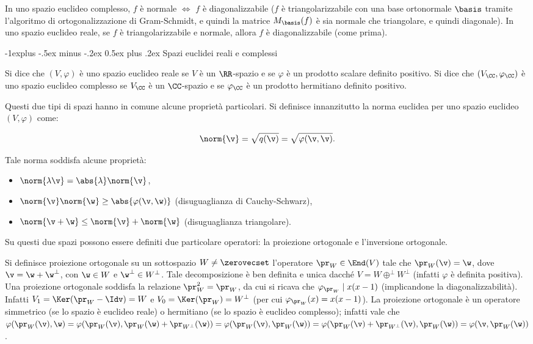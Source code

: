 \documentclass[10pt,landscape]{article}
\makeatletter
\renewcommand{\subsection}{\@startsection{subsection}{2}{0mm}%
	{-1explus -.5ex minus -.2ex}%
	{0.5ex plus .2ex}%
	{\normalfont\normalsize\bfseries}}
\makeatother
\begin{document}
\begin{multicols}{3}
		In uno spazio euclideo complesso, $f$ è normale $\iff$ $f$ è diagonalizzabile ($f$ è triangolarizzabile con una base ortonormale $\basis$ tramite
		l'algoritmo di ortogonalizzazione di Gram-Schmidt, e quindi la matrice $M_\basis(f)$ è sia normale che
		triangolare, e quindi diagonale). In uno spazio
		euclideo reale, se $f$ è triangolarizzabile e
		normale, allora $f$ è diagonalizzabile (come prima).
		
		\subsection{Spazi euclidei reali e complessi}
		
		Si dice che $(V, \varphi)$ è uno spazio euclideo reale se $V$ è un $\RR$-spazio e se
		$\varphi$ è un prodotto scalare definito positivo. Si dice che $(V_\CC, \varphi_\CC)$ è uno spazio euclideo complesso se $V_\CC$ è un $\CC$-spazio e se $\varphi_\CC$ è un
		prodotto hermitiano definito positivo.
		
		Questi due tipi di spazi hanno in comune alcune proprietà particolari. Si definisce
		innanzitutto la norma euclidea per uno spazio euclideo $(V, \varphi)$ come:
		
		\[ \norm{\v} = \sqrt{q(\v)} = \sqrt{\varphi(\v, \v)}. \]
		
		Tale norma soddisfa alcune proprietà:
		
		\begin{itemize}
			\item $\norm{\lambda \v} = \abs{\lambda} \norm{\v}$,
			\item $\norm{\v} \norm{\w} \geq \abs{\varphi(\v, \w)}$ (disuguaglianza di Cauchy-Schwarz),
			\item $\norm{\v + \w} \leq \norm{\v} + \norm{\w}$ (disuguaglianza triangolare).
		\end{itemize}
		
		Su questi due spazi possono essere definiti due particolare operatori: la
		proiezione ortogonale e l'inversione ortogonale.
		
		Si definisce proiezione ortogonale su un sottospazio $W \neq \zerovecset$ l'operatore $\pr_W \in \End(V)$ tale
		che $\pr_W(\v) = \w$, dove $\v = \w + \w^\perp$, con $\w \in W$ e $\w^\perp \in W^\perp$. Tale decomposizione è ben definita e unica dacché $V = W \oplus^\perp W^\perp$ (infatti $\varphi$ è definita positiva). Una proiezione ortogonale
		soddisfa la relazione $\pr_W^2 = \pr_W$, da cui si ricava che $\varphi_{\pr_W} \mid x(x-1)$ (implicandone la diagonalizzabilità). Infatti $V_1 = \Ker(\pr_W - \Idv) = W$ e $V_0 = \Ker(\pr_W) = W^\perp$ (per cui $\varphi_{\pr_W}(x) = x(x-1)$). La
		proiezione ortogonale è un operatore simmetrico (se lo spazio è euclideo reale)
		o hermitiano (se lo spazio è euclideo complesso); infatti vale che
		$\varphi(\pr_W(\v), \w) = \varphi(\pr_W(\v), \pr_W(\w) + \pr_{W^\perp}(\w)) =
		\varphi(\pr_W(\v), \pr_W(\w)) = \varphi(\pr_W(\v) + \pr_{W^\perp}(\v), \pr_W(\w)) =
		\varphi(\v, \pr_W(\w))$.
		

\end{multicols}
\end{document}
